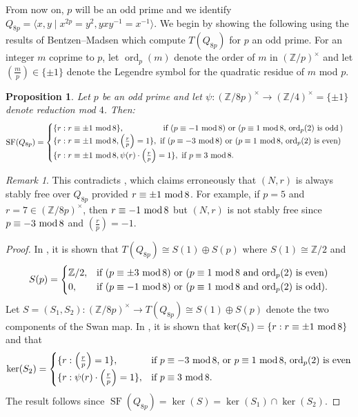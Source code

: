 \documentclass[11pt,leqno,a4paper]{amsart}
\newcommand{\Z}{\mathbb{Z}}
\renewcommand{\mod}{\,\,\text{\normalfont mod}\,}
\DeclareMathOperator{\ord}{ord}
\DeclareMathOperator{\SF}{SF}
\newtheorem{prop}[thm]{Proposition}
\theoremstyle{definition}
\theoremstyle{remark}
\newtheorem{remark}[thm]{Remark}
\theoremstyle{custom}
\begin{document}
From now on, $p$ will be an odd prime and we identify $Q_{8p} = \langle x,y \mid x^{2p}=y^2,yxy^{-1}=x^{-1}\rangle$.
We begin by showing the following using the results of Bentzen--Madsen \cite{BM83} which compute $T(Q_{8p})$ for $p$ an odd prime. 
For an integer $m$ coprime to $p$, let $\ord_p(m)$ denote the order of $m$ in $(\Z/p)^\times$ and let $\left(\frac{m}{p}\right) \in \{\pm 1\}$ denote the Legendre symbol for the quadratic residue of $m$ mod $p$.

\begin{prop} \label{prop:SF(Q8p)}
Let $p$ be an odd prime and let $\psi : (\Z/8p)^\times \to (\Z/4)^\times = \{ \pm 1\}$ denote reduction mod $4$. Then:
\[
\SF(Q_{8p}) =  
\begin{cases}
\{r : r \equiv \pm 1 \mod 8 \},  \hspace{17mm} \text{if {\normalfont (}$p \equiv -1 \mod 8${\normalfont)} or {\normalfont (}$p \equiv 1 \mod 8$, $\ord_p(2)$ is odd\,{\normalfont)}}\\
\{r : r \equiv \pm 1 \mod 8, \left(\frac{r}{p}\right) = 1 \},  \,\,\text{if {\normalfont (}$p \equiv -3 \mod 8${\normalfont)} or {\normalfont (}$p \equiv 1 \mod 8$, $\ord_p(2)$ is even{\normalfont)}} \\
\{r : r \equiv \pm 1 \mod 8, \psi(r) \cdot \left(\frac{r}{p}\right) = 1 \}, \,\,\text{if $p \equiv 3 \mod 8$.}
\end{cases}
\]
\end{prop}

\begin{remark}
This contradicts \cite[Theorem 1]{LT73}, which claims erroneously that $(N,r)$ is always stably free over $Q_{8p}$ provided $r \equiv \pm 1 \mod 8$. For example, if $p = 5$ and $r=7 \in (\Z/8p)^\times$, then $r \equiv -1 \mod 8$ but $(N,r)$ is not stably free since $p \equiv -3 \mod 8$ and $\left(\frac{r}{p}\right) = -1$.
\end{remark}

\begin{proof}
In \cite[Theorem 3.5]{BM83}, it is shown that
$T(Q_{8p}) \cong S(1) \oplus S(p)$
where $S(1) \cong \Z/2$ and 
\[
S(p) =
\begin{cases}
\Z/2, & \text{if {\normalfont (}$p \equiv \pm 3 \mod 8${\normalfont)} or {\normalfont (}$p \equiv 1 \mod 8$ and $\ord_p(2)$ is even{\normalfont)}} \\
0, & \text{if {\normalfont (}$p \equiv -1 \mod 8${\normalfont)} or {\normalfont (}$p \equiv 1 \mod 8$ and $\ord_p(2)$ is odd{\normalfont)}.}	
\end{cases}
 \]
Let $S = (S_1,S_2) : (\Z/8p)^\times \to T(Q_{8p}) \cong S(1) \oplus S(p)$ denote the two components of the Swan map. 
In \cite[Addendum 3.6]{BM83}, it is shown that $\ker(S_1) = \{r : r \equiv \pm 1 \mod 8\}$ and that
\[ \ker(S_2) = 
\begin{cases}
	\{ r : \left(\frac{r}{p}\right) = 1\}, & \text{if $p \equiv -3 \mod 8$, or $p \equiv 1 \mod 8$, $\ord_p(2)$ is even} \\
	\{ r : \psi(r) \cdot \left(\frac{r}{p}\right) = 1\}, & \text{if $p \equiv 3 \mod 8$.}
\end{cases}
 \]
The result follows since $\SF(Q_{8p}) = \ker(S) = \ker(S_1) \cap \ker(S_2)$.
\end{proof}
\end{document}
